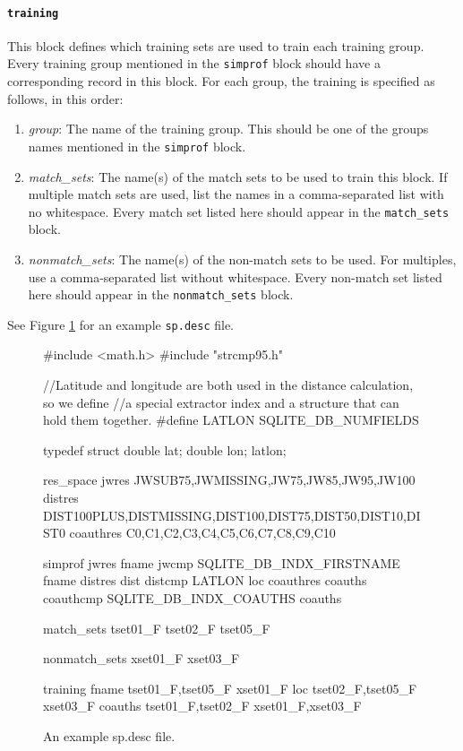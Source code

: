 \documentclass[10pt, letterpaper]{article}
\begin{document}
\paragraph{\texttt{training}}
This block defines which training sets are used to train each training group.
Every training group mentioned in the \texttt{simprof} block should have a corresponding record in this block.
For each group, the training is specified as follows, in this order:
\begin{enumerate}
\item \emph{group}: The name of the training group. This should be one of the groups names mentioned in the \texttt{simprof} block.
\item \emph{match\_sets}: The name(s) of the match sets to be used to train this block. If multiple match sets are used, list the names in a comma-separated list with no whitespace.
Every match set listed here should appear in the \texttt{match\_sets} block.
\item \emph{nonmatch\_sets}: The name(s) of the non-match sets to be used. For multiples, use a comma-separated list without whitespace.
Every non-match set listed here should appear in the \texttt{nonmatch\_sets} block.
\end{enumerate}
See Figure \ref{spdesc} for an example \texttt{sp.desc} file.
\begin{figure}
\caption{An example sp.desc file.\label{spdesc}}
\begin{verbatimtab}
#include <math.h>
#include "strcmp95.h"

//Latitude and longitude are both used in the distance calculation, so we define
//a special extractor index and a structure that can hold them together.
#define LATLON SQLITE_DB_NUMFIELDS

typedef struct {
    double lat;
    double lon;
} latlon;


res_space{
    jwres       JWSUB75,JWMISSING,JW75,JW85,JW95,JW100
    distres     DIST100PLUS,DISTMISSING,DIST100,DIST75,DIST50,DIST10,DIST0
    coauthres   C0,C1,C2,C3,C4,C5,C6,C7,C8,C9,C10
}

simprof{
    jwres       fname   jwcmp       SQLITE_DB_INDX_FIRSTNAME    fname       
    distres     dist    distcmp     LATLON                      loc
    coauthres   coauths coauthcmp   SQLITE_DB_INDX_COAUTHS      coauths
}

match_sets{
    tset01_F
    tset02_F
    tset05_F
}

nonmatch_sets{
    xset01_F
    xset03_F
}

training{
    fname       tset01_F,tset05_F              xset01_F
    loc         tset02_F,tset05_F              xset03_F
    coauths     tset01_F,tset02_F              xset01_F,xset03_F
}
\end{verbatimtab}
\end{figure}
\end{document}
